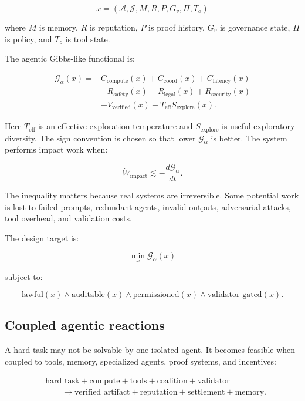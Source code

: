 \documentclass[
  11pt,
]{article}
\begin{document}
\[
x=(\mathcal{A},\mathcal{J},M,R,P,G_v,\Pi,T_o)
\]

where \(M\) is memory, \(R\) is reputation, \(P\) is proof history,
\(G_v\) is governance state, \(\Pi\) is policy, and \(T_o\) is tool
state.

The agentic Gibbs-like functional is:

\[
\begin{aligned}
\mathcal{G}_{\alpha}(x)={}&
C_{\text{compute}}(x)+C_{\text{coord}}(x)+C_{\text{latency}}(x)\\
&+R_{\text{safety}}(x)+R_{\text{legal}}(x)+R_{\text{security}}(x)\\
&-V_{\text{verified}}(x)-T_{\text{eff}}S_{\text{explore}}(x).
\end{aligned}
\]

Here \(T_{\text{eff}}\) is an effective exploration temperature and
\(S_{\text{explore}}\) is useful exploratory diversity. The sign
convention is chosen so that lower \(\mathcal{G}_{\alpha}\) is better.
The system performs impact work when:

\[
\dot{W}_{\text{impact}} \lesssim -\frac{d\mathcal{G}_{\alpha}}{dt}.
\]

The inequality matters because real systems are irreversible. Some
potential work is lost to failed prompts, redundant agents, invalid
outputs, adversarial attacks, tool overhead, and validation costs.

The design target is:

\[
\boxed{
\min_x \mathcal{G}_{\alpha}(x)
}
\]

subject to:

\[
\text{lawful}(x)\land \text{auditable}(x)\land \text{permissioned}(x)\land \text{validator-gated}(x).
\]

\subsection{Coupled agentic reactions}\label{coupled-agentic-reactions}

A hard task may not be solvable by one isolated agent. It becomes
feasible when coupled to tools, memory, specialized agents, proof
systems, and incentives:

\[
\begin{aligned}
&\text{hard task}+\text{compute}+\text{tools}+\text{coalition}+\text{validator}\\
&\qquad\rightarrow\text{verified artifact}+\text{reputation}+\text{settlement}+\text{memory}.
\end{aligned}
\]
\end{document}
